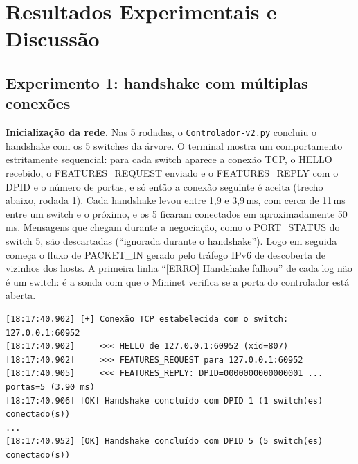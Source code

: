 \documentclass[12pt]{article}
\begin{document}
\section{Resultados Experimentais e Discussão}
\label{sec:resultados}

\subsection{Experimento 1: handshake com múltiplas conexões}
\label{sec:exp1}
\textbf{Inicialização da rede.} Nas 5 rodadas, o \texttt{Controlador-v2.py} concluiu o
handshake com os 5 switches da árvore. O terminal mostra um comportamento estritamente
sequencial: para cada switch aparece a conexão TCP, o HELLO recebido, o
FEATURES\_REQUEST enviado e o FEATURES\_REPLY com o DPID e o número de portas, e só
então a conexão seguinte é aceita (trecho abaixo, rodada 1). Cada handshake levou entre
1,9 e 3,9\,ms, com cerca de 11\,ms entre um switch e o próximo, e os 5 ficaram conectados
em aproximadamente 50\,ms. Mensagens que chegam durante a negociação, como o
PORT\_STATUS do switch 5, são descartadas (``ignorada durante o handshake''). Logo em
seguida começa o fluxo de PACKET\_IN gerado pelo tráfego IPv6 de descoberta de vizinhos
dos hosts. A primeira linha ``[ERRO] Handshake falhou'' de cada log não é um switch: é a
sonda com que o Mininet verifica se a porta do controlador está aberta.

{\footnotesize
\begin{verbatim}
[18:17:40.902] [+] Conexão TCP estabelecida com o switch: 127.0.0.1:60952
[18:17:40.902]     <<< HELLO de 127.0.0.1:60952 (xid=807)
[18:17:40.902]     >>> FEATURES_REQUEST para 127.0.0.1:60952
[18:17:40.905]     <<< FEATURES_REPLY: DPID=0000000000000001 ... portas=5 (3.90 ms)
[18:17:40.906] [OK] Handshake concluído com DPID 1 (1 switch(es) conectado(s))
...
[18:17:40.952] [OK] Handshake concluído com DPID 5 (5 switch(es) conectado(s))
\end{verbatim}
}
\end{document}
